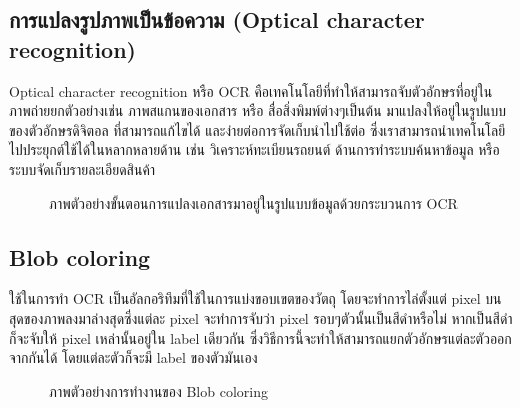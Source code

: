 \documentclass[12pt,oneside,openright,a4paper]{cpe-thai-project}
\begin{document}
\newpage
\subsection{การแปลงรูปภาพเป็นข้อความ (Optical character recognition)}
Optical character recognition หรือ OCR คือเทคโนโลยีที่ทำให้สามารถจับตัวอักษรที่อยู่ในภาพถ่ายยกตัวอย่างเช่น ภาพสแกนของเอกสาร หรือ สื่อสิ่งพิมพ์ต่างๆเป็นต้น มาแปลงให้อยู่ในรูปแบบของตัวอักษรดิจิตอล
 ที่สามารถแก้ไขได้ และง่ายต่อการจัดเก็บนำไปใช้ต่อ ซึ่งเราสามารถนำเทคโนโลยีไปประยุกต์ใช้ได้ในหลากหลายด้าน เช่น วิเคราะห์ทะเบียนรถยนต์ ด้านการทำระบบค้นหาข้อมูล หรือระบบจัดเก็บรายละเอียดสินค้า

\begin{figure}[!ht]\centering
  \setlength{\fboxrule}{0.2mm} %
  \setlength{\fboxsep}{1cm}
  \caption{ภาพตัวอย่างขั้นตอนการแปลงเอกสารมาอยู่ในรูปแบบข้อมูลด้วยกระบวนการ OCR}\label{fig:ocr}
\end{figure}

\subsection{Blob coloring}
ใช้ในการทำ OCR เป็นอัลกอริทึมที่ใช้ในการแบ่งขอบเขตของวัตถุ โดยจะทำการไล่ตั้งแต่ pixel บนสุดของภาพลงมาล่างสุดซึ่งแต่ละ
 pixel จะทำการจับว่า pixel รอบๆตัวนั้นเป็นสีดำหรือไม่ หากเป็นสีดำก็จะจับให้ pixel เหล่านั้นอยู่ใน label เดียวกัน ซึ่งวิธีการนี้จะทำให้สามารถแยกตัวอักษรแต่ละตัวออกจากกันได้ โดยแต่ละตัวก็จะมี label ของตัวมันเอง

\begin{figure}[!ht]\centering
  \setlength{\fboxrule}{0.2mm} %
  \setlength{\fboxsep}{1cm}
  \caption{ภาพตัวอย่างการทำงานของ Blob coloring}\label{fig:blob}
\end{figure}
\end{document}
